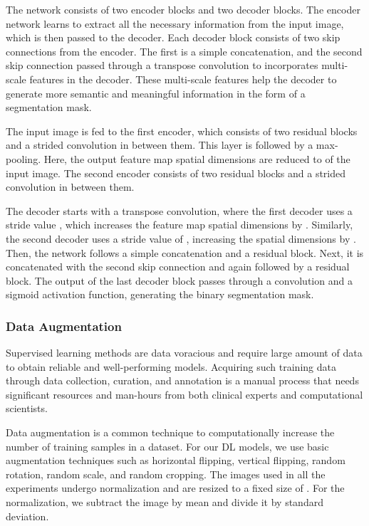 \documentclass[journal]{IEEEtran}
\begin{document}
The network consists of two encoder blocks and two decoder blocks. The encoder network learns to extract all the necessary information from the input image, which is then passed to the decoder. Each decoder block consists of two skip connections from the encoder. The first is a simple concatenation, and the second skip connection passed through a transpose convolution to incorporates multi-scale features in the decoder. These multi-scale features help the decoder to generate more semantic and meaningful information in the form of a segmentation mask.


The input image is fed to the first encoder, which consists of two residual blocks and a  strided convolution in between them.  This layer is followed by a  max-pooling. Here, the output feature map spatial dimensions are reduced to  of the input image.  The second encoder consists of two residual blocks and a  strided convolution in between them.  

The decoder starts with a transpose convolution, where the first decoder uses a stride value , which increases the feature map spatial dimensions by .  Similarly, the second decoder uses a stride value of , increasing the spatial dimensions by . Then, the network follows a simple concatenation and a residual block. Next, it is concatenated with the second skip connection and again followed by a residual block. The output of the last decoder block passes through a  convolution and a sigmoid activation function, generating the binary segmentation mask.







\subsubsection{Data Augmentation}
Supervised learning methods are data voracious and require large  amount of data to obtain reliable and well-performing models. Acquiring such training data through data collection, curation, and annotation is a manual process that needs significant resources and man-hours from both clinical experts and computational scientists. 

Data augmentation is a common technique to computationally increase the number of training samples in a dataset. For our \ac{DL} models, we use basic augmentation techniques such as horizontal flipping, vertical flipping, random rotation, random scale, and random cropping. The images used in all the experiments undergo normalization and are resized to a fixed size of . For the normalization, we subtract the image by mean and divide it by standard deviation.
\end{document}
